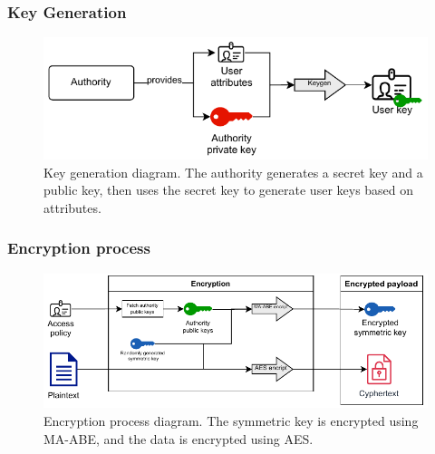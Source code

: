 \documentclass{beamer}
\begin{document}
\begin{frame}
\frametitle{Key Generation}
\begin{figure}
\includegraphics[width=\textwidth,height=0.7\textheight,keepaspectratio]{images/diagrams/keygen_diagram.pdf}
\caption{Key generation diagram. The authority generates a secret key and a public key, then uses the secret key to generate user keys based on attributes.}
\end{figure}
\end{frame}


\begin{frame}
\frametitle{Encryption process}
\begin{figure}
\includegraphics[width=\textwidth,height=0.7\textheight,keepaspectratio]{images/diagrams/encryption_diagram.pdf}
\caption{Encryption process diagram. The symmetric key is encrypted using MA-ABE, and the data is encrypted using AES.}
\end{figure}
\end{frame}
\end{document}
